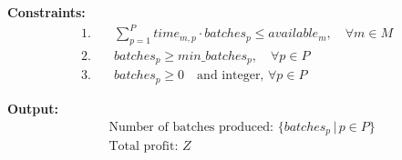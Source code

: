 \documentclass{article}
\begin{document}
\textbf{Constraints:}
\begin{align*}
    1. & \quad \sum_{p=1}^{P} time_{m,p} \cdot batches_{p} \leq available_{m}, \quad \forall m \in M \\
    2. & \quad batches_{p} \geq min\_batches_{p}, \quad \forall p \in P \\
    3. & \quad batches_{p} \geq 0 \quad \text{and integer, } \forall p \in P
\end{align*}

\textbf{Output:}
\begin{align*}
    & \text{Number of batches produced: } \{batches_{p} \,|\, p \in P\} \\
    & \text{Total profit: } Z
\end{align*}
\end{document}
